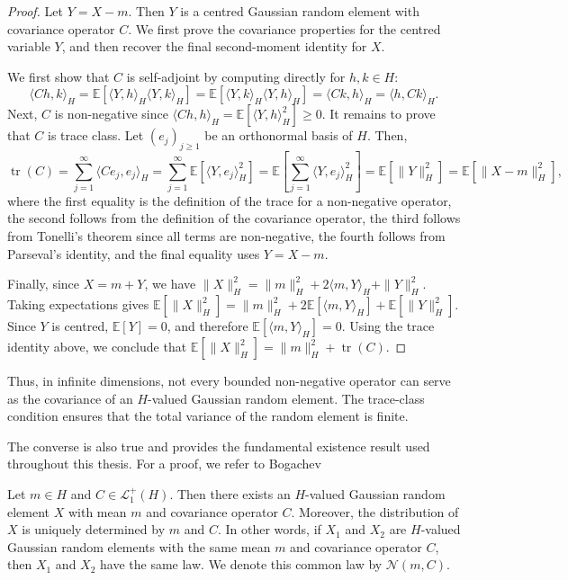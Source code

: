 \begin{proof}
Let \(Y=X-m\). Then \(Y\) is a centred Gaussian random element with covariance operator \(C\). We first prove the covariance properties for the centred variable \(Y\), and then recover the final second-moment identity for \(X\).

We first show that \(C\) is self-adjoint by computing directly for \(h,k\in H\):
\[
\langle Ch,k\rangle_H=\mathbb E[\langle Y,h\rangle_H\langle Y,k\rangle_H]=\mathbb E[\langle Y,k\rangle_H\langle Y,h\rangle_H]=\langle Ck,h\rangle_H=\langle h,Ck\rangle_H.
\]
Next, \(C\) is non-negative since \(\langle Ch,h\rangle_H=\mathbb E[\langle Y,h\rangle_H^2]\geqslant0\). \newline
It remains to prove that \(C\) is trace class. Let \((e_j)_{j\geqslant1}\) be an orthonormal basis of \(H\). Then,
\[\operatorname{tr}(C)=\sum_{j=1}^{\infty}\langle Ce_j,e_j\rangle_H=\sum_{j=1}^{\infty}\mathbb E[\langle Y,e_j\rangle_H^2]=\mathbb E\left[\sum_{j=1}^{\infty}\langle Y,e_j\rangle_H^2\right]=\mathbb E[\|Y\|_H^2]=\mathbb E[\|X-m\|_H^2],
\]
where the first equality is the definition of the trace for a non-negative operator, the second follows from the definition of the covariance operator, the third follows from Tonelli's theorem since all terms are non-negative, the fourth follows from Parseval's identity, and the final equality uses \(Y=X-m\).

Finally, since \(X=m+Y\), we have \(\|X\|_H^2=\|m\|_H^2+2\langle m,Y\rangle_H+\|Y\|_H^2\). Taking expectations gives \(\mathbb E[\|X\|_H^2]=\|m\|_H^2+2\mathbb E[\langle m,Y\rangle_H]+\mathbb E[\|Y\|_H^2]\). Since \(Y\) is centred, \(\mathbb E[Y]=0\), and therefore \(\mathbb E[\langle m,Y\rangle_H]=0\). Using the trace identity above, we conclude that \(\mathbb E[\|X\|_H^2]=\|m\|_H^2+\operatorname{tr}(C)\).
\end{proof}

Thus, in infinite dimensions, not every bounded non-negative operator can serve as the covariance of an \(H\)-valued Gaussian random element. The trace-class condition ensures that the total variance of the random element is finite.

The converse is also true and provides the fundamental existence result used throughout this thesis. For a proof, we refer to Bogachev \parencite[Theorem 2.3.1.]{Bogachev1998}

\begin{theorem}\label{thm:Existence and uniqueness of Gaussian random elements}
Let \(m\in H\) and \(C\in\mathcal L_1^+(H)\). Then there exists an \(H\)-valued Gaussian random element \(X\) with mean \(m\) and covariance operator \(C\). Moreover, the distribution of \(X\) is uniquely determined by \(m\) and \(C\). In other words, if \(X_1\) and \(X_2\) are \(H\)-valued Gaussian random elements with the same mean \(m\) and covariance operator \(C\), then \(X_1\) and \(X_2\) have the same law. We denote this common law by \(\mathcal N(m,C)\).
\end{theorem}

